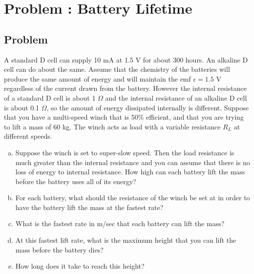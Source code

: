 \documentclass[solutions]{esg8022pset}
\begin{document}
\section{Problem \thesection: Battery Lifetime}
\subsection{Problem}
  A standard D cell can supply 10 mA at 1.5 V for about 300 hours. An alkaline D cell can do about the same. Assume that the chemistry of the batteries will produce the same amount of energy and will maintain the emf $\epsilon = 1.5$ V regardless of the current drawn from the battery. However the internal resistance of a standard D cell is about 1 $\Omega$ and the internal resistance of an alkaline D cell is about 0.1 $\Omega$, so the amount of energy dissipated internally is different. Suppose that you have a multi-speed winch that is 50\% efficient, and that you are trying to lift a mass of 60 kg. The winch acts as load with a variable resistance $R_L$ at different speeds.
  \begin{enumerate}[(a)]
    \item Suppose the winch is set to super-slow speed. Then the load resistance is much greater than the internal resistance and you can assume that there is no loss of energy to internal resistance. How high can each battery lift the mass before the battery uses all of its energy?
    \item For each battery, what should the resistance of the winch be set at in order to have the battery lift the mass at the fastest rate?
    \item What is the fastest rate in m/sec that each battery can lift the mass?
    \item At this fastest lift rate, what is the maximum height that you can lift the mass before the battery dies?
    \item How long does it take to reach this height?
  \end{enumerate}
\end{document}
